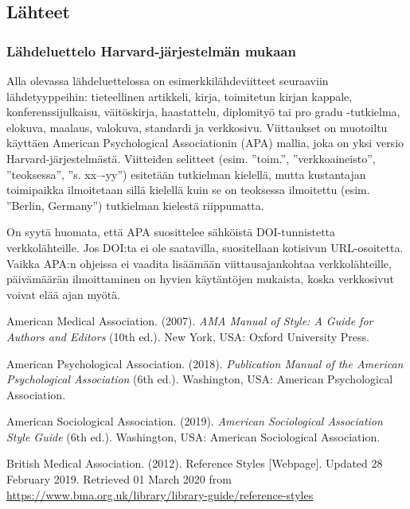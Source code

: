 \documentclass[finnish, 12pt, a4paper, arts, utf8, a-2b, online]{aaltothesis}
\begin{document}
\subsection*{Lähteet}
\subsubsection*{Lähdeluettelo Harvard-järjestelmän mukaan}

Alla olevassa lähdeluettelossa on esimerkkilähdeviitteet seuraaviin 
lähdetyyppeihin: tieteellinen artikkeli, kirja, toimitetun kirjan kappale, 
konferenssijulkaisu, väitöskirja, haastattelu, diplomityö tai pro gradu 
-tutkielma, elokuva, maalaus, valokuva, standardi ja verkkosivu. Viittaukset on 
muotoiltu käyttäen American Psychological Associationin (APA) mallia, joka on 
yksi versio Harvard-järjestelmästä. Viitteiden selitteet (esim. ”toim.”, 
”verkkoaineisto”, ”teoksessa”, ”s. xx–-yy”) esitetään tutkielman kielellä, mutta
kustantajan toimipaikka ilmoitetaan sillä kielellä kuin se on teoksessa 
ilmoitettu (esim. ”Berlin, Germany”) tutkielman kielestä riippumatta.

On syytä huomata, että APA suosittelee sähköistä DOI-tunnistetta 
verkkolähteille. Jos DOI:ta ei ole saatavilla, suositellaan kotisivun 
URL-osoitetta. Vaikka APA:n ohjeissa ei vaadita lisäämään viittausajankohtaa 
verkkolähteille, päivämäärän ilmoittaminen on hyvien käytäntöjen mukaista, koska
verkkosivut voivat elää ajan myötä.

\vspace{1ex}
\noindent
American Medical Association. (2007). 
\textit{AMA Manual of Style: A Guide for Authors and Editors} 
(10th ed.). New York, USA: Oxford University Press.

\vspace{1ex}
\noindent
American Psychological Association. (2018). 
\textit{Publication Manual of the American Psychological Association} 
(6th ed.). Washington, USA: American Psychological Association.

\vspace{1ex}
\noindent
American Sociological Association. (2019). 
\textit{American Sociological Association Style Guide} 
(6th ed.). Washington, USA: American Sociological Association.

\vspace{1ex}
\noindent
British Medical Association. (2012). 
Reference Styles [Webpage]. Updated 28 February 2019. 
Retrieved 01 March 2020 from 
\url{https://www.bma.org.uk/library/library-guide/reference-styles}
\end{document}

